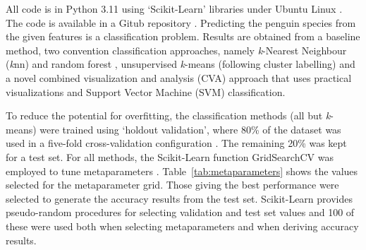 \documentclass[12pt]{article}
\begin{document}
All code is in Python 3.11 \cite{python311} using ‘Scikit-Learn’ libraries \cite{scikit-learn} 
under Ubuntu Linux \cite{ubuntu}. The code is available in a Gitub repository \cite{TimAIRepo}. 
Predicting the penguin species from the given features is a classification problem. 
Results are obtained from a baseline method, two convention classification approaches, 
namely \textit{k}-Nearest Neighbour (\textit{k}nn) \cite{bishop2006pattern} and random forest \cite{breiman2001random}, 
unsupervised \textit{k}-means (following cluster labelling) \cite{tan2005introduction} 
and a novel combined visualization and analysis (CVA) approach that uses 
practical visualizations and Support Vector Machine (SVM) classification.

To reduce the potential for overfitting, the classification methods (all but \textit{k}-means) were trained using 
`holdout validation', where 80\% of the dataset was used in a five-fold cross-validation 
configuration \cite{james2013introduction}. The remaining 20\% was kept for a test set. For all methods, 
the Scikit-Learn function GridSearchCV was employed to tune metaparameters \cite{scikit-learn}. 
Table~\ref{tab:metaparameters} shows the values selected for the metaparameter grid. Those giving the best 
performance were selected to generate the accuracy results from the test set. 
Scikit-Learn provides pseudo-random procedures for selecting validation and test set values and 100 of these were used 
both when selecting metaparameters and when deriving accuracy results.
\end{document}
